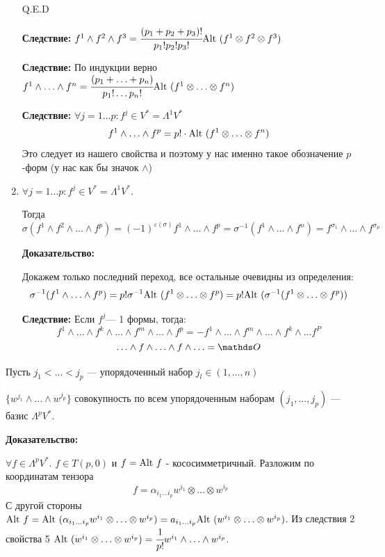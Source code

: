 \begin{enumerate}
    \hfill Q.E.D

    \textbf{Следствие:} $f^1 \wedge f^2 \wedge f^3 = \cfrac{(p_1 + p_2 + p_3)!}{p_1!p_2!p_3!}\text{Alt } (f^1 \otimes f^2 \otimes f^3)$

    \textbf{Следствие:} По индукции верно $f^1 \wedge \ldots \wedge f^n = \cfrac{(p_1 +\ldots +  p_n)}{p_1!\ldots p_n!} \text{Alt } (f^1 \otimes \ldots \otimes f^n)$

    \textbf{Следствие:} $\forall j = 1 \ldots p: f^j\in V^* = \Lambda^1 V^*$
    $$f^1\wedge \ldots \wedge f^p = p!\cdot \text{Alt }(f^1 \otimes \ldots \otimes f^n)$$
    Это следует из нашего свойства и поэтому у нас именно такое обозначение $p$-форм (у нас как бы значок $\wedge$)

    \item $\forall j=1\ldots p : f^j \in V^*= \Lambda^1V^*$.
    
    Тогда $$\sigma(f^1 \wedge f^2 \wedge \ldots\wedge  f^p) = (-1)^{\varepsilon(\sigma)}f^1\wedge \ldots \wedge f^p = \sigma^{-1}(f^1\wedge \ldots \wedge f^n) = f^{\sigma_1}\wedge \ldots \wedge f^{\sigma_p}$$

    \textbf{Доказательство:}

    Докажем только последний переход, все остальные очевидны из определения:
    $$\sigma^{-1}(f^1 \wedge \ldots \wedge f^p ) = p! \sigma^{-1}\text{Alt } (f^1 \otimes \ldots \otimes f^p ) =p!\text{Alt } (\sigma^{-1}(f^1 \otimes \ldots \otimes f^p)) $$

    \textbf{Следствие:} Если $f^j$--- 1 формы, тогда:
    $$f^1 \wedge \ldots \wedge f^k \wedge \ldots \wedge f^m \wedge \ldots \wedge f^p = -f^1 \wedge \ldots \wedge f^m \wedge \ldots \wedge f^k \wedge \ldots f^P$$
    $$\ldots \wedge f \wedge \ldots \wedge f \wedge \ldots = \zero$$
\end{enumerate}


Пусть $j_1 < \ldots  < j_p$ --- упорядоченный набор $j_l \in (1,\ldots,n)$

$\{w^{j_1}\wedge \ldots \wedge w^{j_p}\}$ совокупность по всем упорядоченным наборам $(j_1,\ldots, j_p)$ --- базис $\Lambda^pV^*$.

\textbf{Доказательство:}


$\forall f \in \Lambda^p V^*$. $f\in T(p,0)$ и $f = \text{Alt } f$ - кососимметричный. Разложим по координатам тензора
$$f= \alpha_{i_1\ldots i_p} w^{i_1}\otimes \ldots \otimes w^{i_p}$$
С другой стороны $\text{Alt } f = \text{Alt } (\alpha_{i_1\ldots i_p}w^{i_1}\otimes  \ldots \otimes w^{i_p}) = a_{i_1\ldots i_p}\text{Alt } (w^{i_1}\otimes \ldots \otimes w^{i_p})$. Из следствия 2 свойства 5 $\text{Alt } (w^{i_1}\otimes \ldots \otimes w^{i_p}) = \cfrac{1}{p!}w^{i_1}\wedge \ldots \wedge w^{i_p}$. 

